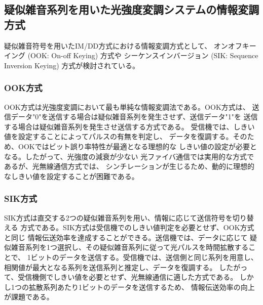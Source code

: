 \subsection{疑似雑音系列を用いた光強度変調システムの情報変調方式}
疑似雑音符号を用いたIM/DD方式における情報変調方式として、
オンオフキーイング (OOK: On-off Keying) 方式\cite{ook}や
シーケンスインバージョン (SIK: Sequence Inversion Keying) 方式\cite{sik1}\cite{sik2}が検討されている。
\subsubsection{OOK方式}
OOK方式は光強度変調において最も単純な情報変調法である。OOK方式は、
送信データ"0"を送信する場合は疑似雑音系列を発生させず、送信データ"1"を
送信する場合は疑似雑音系列を発生させ送信する方式である。
受信機では、しきい値を設定することによってパルスの有無を判定し、
データを復調する。そのため、OOKではビット誤り率特性が最適となる理想的な
しきい値の設定が必要となる。したがって、光強度の減衰が少ない
光ファイバ通信では実用的な方式であるが、光無線通信方式では、
シンチレーションが生じるため、動的に理想的なしきい値を設定することが困難である。

\subsubsection{SIK方式}
SIK方式は直交する2つの疑似雑音系列を用い、情報に応じて送信符号を切り替える
方式である。SIK方式は受信機でのしきい値判定を必要とせず、OOK方式と同じ
情報伝送効率を達成することができる。送信機では、データに応じて
疑似雑音系列を1つ選択し、その疑似雑音系列に従って光パルスを時間拡散することで、
1ビットのデータを送信する。受信機では、送信側と同じ系列を用意し、
相関値が最大となる系列を送信系列と推定し、データを復調する。
したがって、受信機側でしきい値を必要とせず、光無線通信に適した方式である。
しかし1つの拡散系列あたり1ビットのデータを送信するため、
情報伝送効率の向上が課題である。
%

